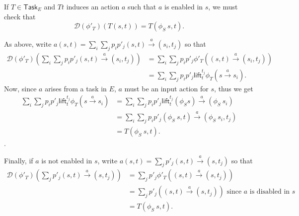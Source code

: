 \documentclass{article}
\newcommand{\Task}{\mathsf{Task}}
\newcommand{\D}{\mathcal{D}}
\begin{document}
If $T \in \Task_E$ and $Tt$ induces an action $a$ such that $a$ is enabled in $s$, we must check that
\[\D(\phi'_T)(T (s,t)) = T (\phi_S\ s, t).\]

As above, write $a (s,t) = \sum_i \sum_j p_i p'_j (s,t) \xrightarrow{a} (s_i, t_j)$ so that
\begin{align*}
    \D(\phi'_T)(\sum_i \sum_j p_i p'_j (s,t) \xrightarrow{a} (s_i, t_j)) &=
         \sum_i \sum_j p_i p'_j \phi'_T ((s,t) \xrightarrow{a} (s_i, t_j)) \\
    &= \sum_i \sum_j p_i p'_j \mathsf{lift}_t^{t_j} \phi_T (s \xrightarrow{a} s_i).
  \end{align*}
Now, since $a$ arises from a task in $E$, $a$ must be an input action for $s$, thus we get
\begin{align*}
    \sum_i \sum_j p_i p'_j \mathsf{lift}_t^{t_j} \phi_T (s \xrightarrow{a} s_i) &= \sum_i \sum_j p_i p'_j \mathsf{lift}_t^{t_j} (\phi_S s) \xrightarrow{a} (\phi_S\ s_i) \\
    &= \sum_i \sum_j p_i p'_j (\phi_S\ s, t) \xrightarrow{a} (\phi_S\ s_i, t_j) \\
    &= T (\phi_S\ s, t).
\end{align*}.

Finally, if $a$ is not enabled in $s$, write $a (s,t) = \sum_j p'_j (s,t) \xrightarrow{a} (s, t_j)$ so that
\begin{align*}
    \D(\phi'_T)(\sum_j p'_j (s,t) \xrightarrow{a} (s, t_j)) &= \sum_j p'_j \phi'_T ((s,t) \xrightarrow{a} (s, t_j)) \\
    &= \sum_j p'_j ((s,t) \xrightarrow{a} (s, t_j)) \text{ since $a$ is disabled in $s$ } \\
    &= T (\phi_S\ s,t).
\end{align*}
\end{document}
